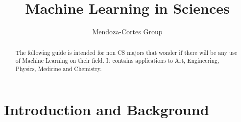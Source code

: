 \documentclass[11pt,letterpaper]{report}
\author{Mendoza-Cortes Group}
\title{Machine Learning in Sciences}
\begin{document}
	
	\setcounter{page}{1}
	\thispagestyle{empty}
	
	
	
	
	\maketitle
	
	\newpage
	
	\tableofcontents
	
	\listoftables
	
	\listoffigures
	
	
	\clearpage
	\newpage
	\setcounter{page}{1}
	\pagestyle{fancy}
	
	
	
	
	\chapter{Introduction and Background}
	
	\begin{abstract}
		The following guide is intended for non CS majors that wonder if there will be any use of Machine Learning on their field. It contains applications to Art, Engineering, Physics, Medicine and Chemistry.
	\end{abstract}
	
	\clearpage
	\newpage
	
	
	
\end{document}
